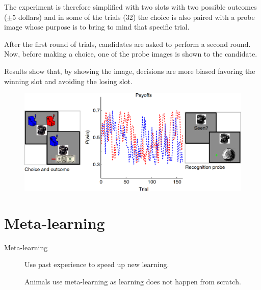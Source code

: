 \begin{description}
\begin{casestudy}
\begin{description}
                    The experiment is therefore simplified with two slots with two possible outcomes ($\pm 5$ dollars) and in some of the trials (32) the choice is also paired with a probe image whose purpose is to bring to mind that specific trial.

                    After the first round of trials, candidates are asked to perform a second round. Now, before making a choice, one of the probe images is shown to the candidate.
                    
                    Results show that, by showing the image, decisions are more biased favoring the winning slot and avoiding the losing slot.

                    \begin{figure}[H]
                        \centering
                        \includegraphics[width=0.6\linewidth]{./img/memory_decision2.png}
                    \end{figure}
            \end{description}
        \end{casestudy}
\end{description}



\section{Meta-learning}

\begin{description}
    \item[Meta-learning] 
        Use past experience to speed up new learning.

        \begin{remark}
            Animals use meta-learning as learning does not happen from scratch.
        \end{remark}
\end{description}

